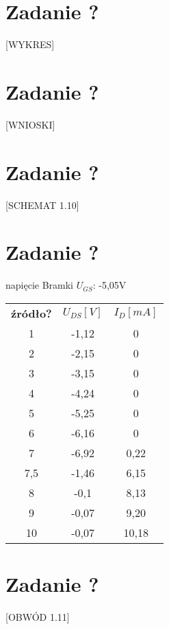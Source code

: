 \documentclass[polish,a4paper]{article}
\begin{document}
\section{Zadanie ?}
[WYKRES]


\section{Zadanie ?}
[WNIOSKI]

\section{Zadanie ?}
[SCHEMAT 1.10]

\section{Zadanie ?}
napięcie Bramki $U_{GS}$: -5,05V


\begin{center}
\begin{tabular}{|c|c|c|}
\hline
\textbf{źródło?} & \textbf{$U_{DS} [V]$} & \textbf{$I_D [mA]$}\\
\hhline{|=|=|=|}

1 & -1,12 & 0 \\
\hline
2 & -2,15 & 0 \\
\hline
3 & -3,15 & 0 \\
\hline
4 & -4,24 & 0 \\
\hline
5 & -5,25 & 0 \\
\hline
6 & -6,16 & 0 \\
\hline
7 & -6,92 & 0,22 \\
\hline
7,5 & -1,46 & 6,15 \\
\hline
8 & -0,1 & 8,13 \\
\hline
9 & -0,07 & 9,20 \\
10 & -0,07 & 10,18 \\
\hline

\end{tabular}
\end{center}

\section{Zadanie ?}
[OBWÓD 1.11]
\end{document}
